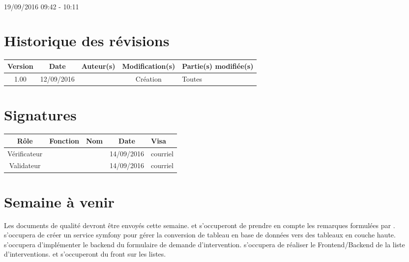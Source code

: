 \documentclass [a4paper] {article}
\begin{document}
19/09/2016			 				%
\hfill   
\hfill 	 09:42 - 10:11				%



\section*{Historique des révisions}
\begin{center}
			\begin{tabular}{| c | c | c | c | p{4cm} |}
				\hline
				\rowcolor{Gray}
				Version & Date & Auteur(s) & Modification(s) & Partie(s) modifiée(s)		 \\
				\hline
				1.00 & 12/09/2016 & \Kafui & Création & Toutes \\
		\hline		
			\end{tabular}
		\end{center}

\section*{Signatures}

		\begin{center}
			\begin{tabular}{| c | c | c | c | p{4cm} |}
				\hline
				\rowcolor{Gray}
				Rôle & Fonction & Nom & Date & Visa		 \\
				\hline
				Vérificateur & \RQ & \Melissa & 14/09/2016 & courriel \\[30pt]
				\hline
				Validateur & \CP & \Pierre & 14/09/2016 & courriel \\[30pt]	
				\hline
			\end{tabular}
		\end{center}

\section{Semaine à venir}
Les documents de qualité devront être envoyés cette semaine. \Julie{} et \Melissa{} s'occuperont de prendre en compte les remarques formulées par \nomTuteurPedago{}. \Florian{} s'occupera de créer un service symfony pour gérer la conversion de tableau en base de données vers des tableaux en couche haute.
\Kafui{} s'occupera d'implémenter le backend du formulaire de demande d'intervention. \Julie{} s'occupera de réaliser le Frontend/Backend de la liste d'interventions.
\Francois{} et \Juliana{} s'occuperont du front sur les listes.






\end{document}
